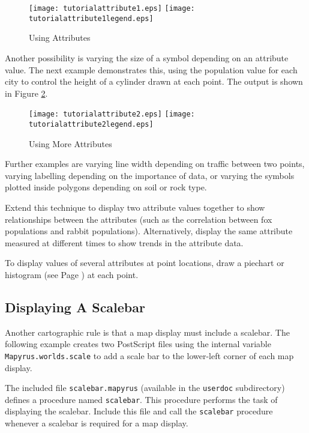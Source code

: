 

\begin{figure}[htb]
\texttt{[image: tutorialattribute1.eps]}
\texttt{[image: tutorialattribute1legend.eps]}
\caption{Using Attributes}
\label{tutorialattribute1}
\end{figure}

Another possibility is varying the size of a symbol depending
on an attribute value.  The next example demonstrates this, using the
population value for each city to control the height of a
cylinder drawn at each point.
The output is shown in Figure \ref{tutorialattribute2}.



\begin{figure}[htb]
\texttt{[image: tutorialattribute2.eps]}
\texttt{[image: tutorialattribute2legend.eps]}
\caption{Using More Attributes}
\label{tutorialattribute2}
\end{figure}

Further examples are varying line width depending on traffic between
two points, varying labelling depending on the importance of data,
or varying the symbols plotted inside
polygons depending on soil or rock type.

Extend this technique to display two attribute values together to show
relationships between the attributes (such as the correlation between fox
populations and rabbit populations).  Alternatively, display the same attribute
measured at different times to show trends in the attribute data.

To display values of several attributes at point locations, draw a
piechart or histogram (see Page \pageref{piechart}) at each point.

\subsection{Displaying A Scalebar}
\label{tutorialscalebar}

Another cartographic rule is that a map display must include a scalebar.  The
following example creates two PostScript files using the internal variable
\texttt{Mapyrus.worlds.scale} to add a scale bar to the lower-left corner
of each map display.

The included file \texttt{scalebar.mapyrus} (available in the \texttt{userdoc}
subdirectory) defines a procedure named \texttt{scalebar}.  This procedure
performs the task of displaying the scalebar.  Include this file and call the
\texttt{scalebar} procedure whenever a scalebar is required for a map display.

